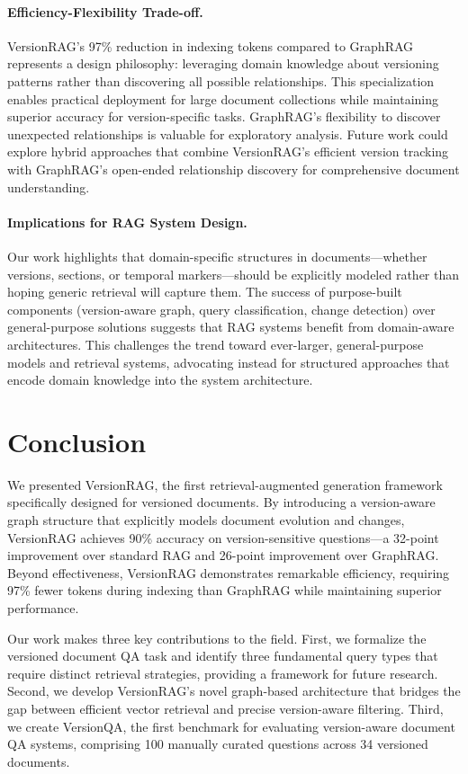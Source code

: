 \paragraph{Efficiency-Flexibility Trade-off.}
VersionRAG's 97\% reduction in indexing tokens compared to GraphRAG represents a design philosophy: leveraging domain knowledge about versioning patterns rather than discovering all possible relationships. This specialization enables practical deployment for large document collections while maintaining superior accuracy for version-specific tasks. GraphRAG's flexibility to discover unexpected relationships is valuable for exploratory analysis. Future work could explore hybrid approaches that combine VersionRAG's efficient version tracking with GraphRAG's open-ended relationship discovery for comprehensive document understanding.

\paragraph{Implications for RAG System Design.}
Our work highlights that domain-specific structures in documents—whether versions, sections, or temporal markers—should be explicitly modeled rather than hoping generic retrieval will capture them. The success of purpose-built components (version-aware graph, query classification, change detection) over general-purpose solutions suggests that RAG systems benefit from domain-aware architectures. This challenges the trend toward ever-larger, general-purpose models and retrieval systems, advocating instead for structured approaches that encode domain knowledge into the system architecture.


\section{Conclusion}
We presented VersionRAG, the first retrieval-augmented generation framework specifically designed for versioned documents. By introducing a version-aware graph structure that explicitly models document evolution and changes, VersionRAG achieves 90\% accuracy on version-sensitive questions—a 32-point improvement over standard RAG and 26-point improvement over GraphRAG. Beyond effectiveness, VersionRAG demonstrates remarkable efficiency, requiring 97\% fewer tokens during indexing than GraphRAG while maintaining superior performance.

Our work makes three key contributions to the field. First, we formalize the versioned document QA task and identify three fundamental query types that require distinct retrieval strategies, providing a framework for future research. Second, we develop VersionRAG's novel graph-based architecture that bridges the gap between efficient vector retrieval and precise version-aware filtering. Third, we create VersionQA, the first benchmark for evaluating version-aware document QA systems, comprising 100 manually curated questions across 34 versioned documents.

